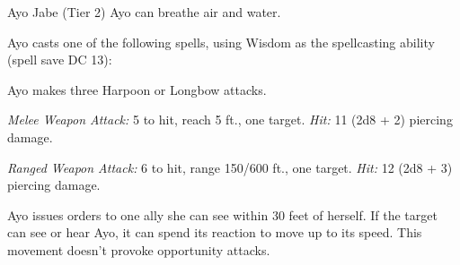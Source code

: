 \documentclass[10pt,a4paper,twoside,bg=print,twocolumn,openany,nodeprecatedcode]{dndbook}
\begin{document}
\begin{DndMonster}[float=t]{Ayo Jabe (Tier 2)}
\DndMonsterBasics[
armor-class = {15 (studded leather armor)},
hit-points = {\DndDice{15d8 + 30}},
speed = {30 ft., swim 30 ft.}
]
\DndMonsterAbilityScores[
 str = 14,
 dex = 16,
 con = 14,
 int = 10,
 wis = 14,
 cha = 12
]
\DndMonsterDetails[
saving-throws = {Str +5, Dex +6},
skills = {Athletics +5, Perception +5, Survival +5},
damage-resistances = {acid},
languages = {Common, Goblin, Orc},
challenge = 5,
]
Ayo can breathe air and water.

Ayo casts one of the following spells, using Wisdom as the spellcasting ability (spell save DC 13):
\begin{DndMonsterSpells}
\end{DndMonsterSpells}
Ayo makes three Harpoon or Longbow attacks.

\textsl{Melee Weapon Attack:} 5 to hit, reach 5 ft., one target. \textsl{Hit:} 11 (2d8 + 2) piercing damage.

\textsl{Ranged Weapon Attack:} 6 to hit, range 150/600 ft., one target. \textsl{Hit:} 12 (2d8 + 3) piercing damage.

Ayo issues orders to one ally she can see within 30 feet of herself. If the target can see or hear Ayo, it can spend its reaction to move up to its speed. This movement doesn't provoke opportunity attacks.

\end{DndMonster}
\end{document}
